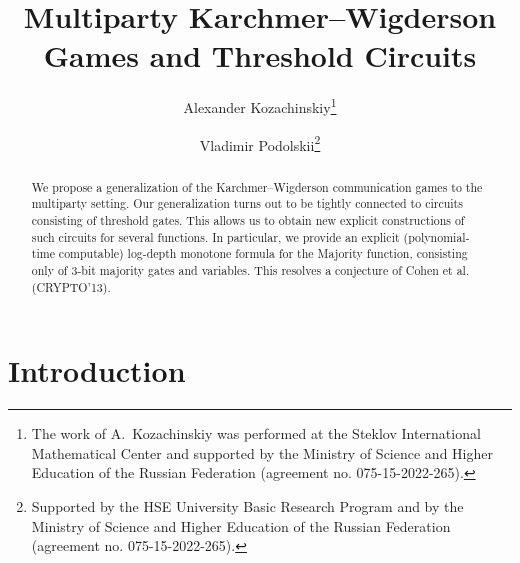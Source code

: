 \documentclass{toc}
\begin{document}
\begin{frontmatter}%

%
%
%

%
%


\title{Multiparty Karchmer--Wigderson Games and Threshold Circuits}
%
%

%
%
%
%
%
%

%
%
%
%
%
%
%
%
%
%
%
%


%
%
%
%

%

\author[kozachinskiy]{Alexander Kozachinskiy\thanks{The work of A.~Kozachinskiy was performed at the Steklov International Mathematical Center and supported by the Ministry of Science and Higher Education of the Russian Federation (agreement no. 075-15-2022-265).}}
\author[podolskii]{Vladimir Podolskii\thanks{Supported by the HSE University Basic Research Program and by the Ministry of Science and Higher Education of the Russian Federation (agreement no. 075-15-2022-265).}}



%
%
%
%

%
%
%
%
%
%
%
%
\begin{abstract}
We propose a generalization of the 
Karchmer--Wigderson communication games to the multiparty setting. Our generalization turns out to be tightly connected to circuits consisting of threshold gates. This allows us to obtain new explicit constructions of such circuits for several functions.
In particular, we provide an explicit (polynomial-time computable)
log-depth monotone formula for the 
Majority function, consisting only of 3-bit majority gates and variables.
This resolves a conjecture of Cohen et al. (CRYPTO'13). 
\end{abstract}

%

\end{frontmatter}

%
%
%

%

 \section{Introduction} \label{sec:intro}
\end{document}
